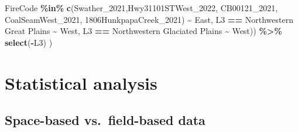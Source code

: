 \documentclass[
]{article}
\newenvironment{Shaded}{\begin{snugshade}}{\end{snugshade}}
\newcommand{\FunctionTok}[1]{\textcolor[rgb]{0.13,0.29,0.53}{\textbf{#1}}}
\newcommand{\NormalTok}[1]{#1}
\newcommand{\SpecialCharTok}[1]{\textcolor[rgb]{0.81,0.36,0.00}{\textbf{#1}}}
\newcommand{\StringTok}[1]{\textcolor[rgb]{0.31,0.60,0.02}{#1}}
\begin{document}
\begin{Shaded}
\begin{Highlighting}[]
\NormalTok{                  FireCode }\SpecialCharTok{\%in\%} \FunctionTok{c}\NormalTok{(}\StringTok{\textquotesingle{}Swather\_2021\textquotesingle{}}\NormalTok{,}\StringTok{\textquotesingle{}Hwy31101STWest\_2022\textquotesingle{}}\NormalTok{, }\StringTok{\textquotesingle{}CB00121\_2021\textquotesingle{}}\NormalTok{, }
                                  \StringTok{\textquotesingle{}CoalSeamWest\_2021\textquotesingle{}}\NormalTok{, }\StringTok{\textquotesingle{}1806HunkpapaCreek\_2021\textquotesingle{}}\NormalTok{) }\SpecialCharTok{\textasciitilde{}}
                    \StringTok{\textquotesingle{}East\textquotesingle{}}\NormalTok{, }
\NormalTok{                  L3 }\SpecialCharTok{==} \StringTok{\textquotesingle{}Northwestern Great Plains\textquotesingle{}} \SpecialCharTok{\textasciitilde{}} \StringTok{\textquotesingle{}West\textquotesingle{}}\NormalTok{,}
\NormalTok{                  L3 }\SpecialCharTok{==} \StringTok{\textquotesingle{}Northwestern Glaciated Plains\textquotesingle{}} \SpecialCharTok{\textasciitilde{}} \StringTok{\textquotesingle{}West\textquotesingle{}}\NormalTok{)) }\SpecialCharTok{\%\textgreater{}\%} 
      \FunctionTok{select}\NormalTok{(}\SpecialCharTok{{-}}\NormalTok{L3) ) }
\end{Highlighting}
\end{Shaded}

\section{Statistical analysis}\label{statistical-analysis}

\subsection{Space-based vs.~field-based
data}\label{space-based-vs.-field-based-data}
\end{document}
